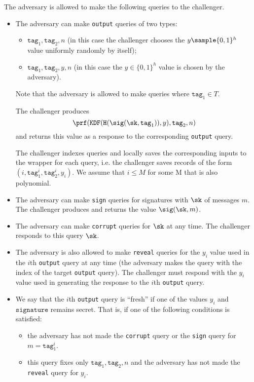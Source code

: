 \documentclass{article}
\begin{document}
{The adversary is allowed to make the following queries to the challenger.


\begin{itemize}
	
	\item The adversary can make \texttt{output} queries of two types:
	\begin{itemize}
		\item $\texttt{tag}_1, \texttt{tag}_2, n$ (in this case the challenger chooses the $y \sample \{0,1\}^h$ value uniformly randomly by itself);
		\item $\texttt{tag}_1, \texttt{tag}_2,y,n$ (in this case the $y \in \{0,1\}^h$ value is chosen by the adversary).
	\end{itemize}
	
	Note that the adversary is allowed to make queries where $\texttt{tag}_1 \in T$. 
	
	The challenger produces $$
	\prf(\texttt{KDF}(\texttt{H}(\sig (\sk,\texttt{tag}_1)), y), \texttt{tag}_2,n)
	$$
	and returns this value as a response to the corresponding \texttt{output} query.
	
	The challenger indexes queries and locally saves the corresponding inputs to the wrapper for each query, i.e. the challenger saves records of the form $(i,\texttt{tag}_1^i,\texttt{tag}_2^i,y_i)$.  We assume that $i \le M$ for some M that is also polynomial.
	
	\item The adversary can make \texttt{sign} queries for signatures with $\sk$ of messages $m$. The challenger produces and returns the value $\sig (\sk, m)$.
	
	\item The adversary can make \texttt{corrupt} queries for $\sk$ at any time. The challenger responds to this query $\sk$.
	
	\item The adversary is also allowed to make \texttt{reveal} queries for the $y_i$ value used in the $i$th \texttt{output} query at any time (the adversary makes the query with the index of the target \texttt{output} query). The challenger must respond with the $y_i$ value used in generating the response to the $i$th \texttt{output} query.
	
	\item We say that the $i$th \texttt{output} query is ``fresh'' if one of the values $y_i$ and $\mathrm{\texttt{signature}}$ remains secret. That is, if one of the following conditions is satisfied:
	\begin{itemize}
		\item the adversary has not made the \texttt{corrupt} query or the \texttt{sign} query for $m = \texttt{tag}_1^i$. 
		\item this query fixes only $\texttt{tag}_1, \texttt{tag}_2 , n$ and the adversary has not made the \texttt{reveal} query for  $y_i$.
	\end{itemize}
	

\end{itemize}}
\end{document}

